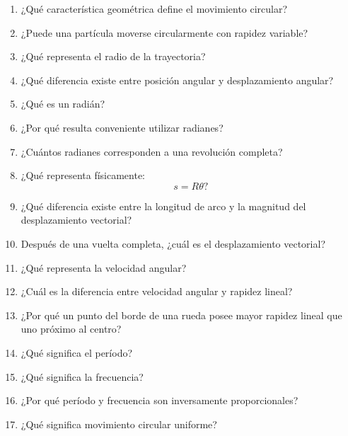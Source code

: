 \begin{enumerate}

    \item ¿Qué característica geométrica define el movimiento circular?

    \item ¿Puede una partícula moverse circularmente con rapidez variable?

    \item ¿Qué representa el radio de la trayectoria?

    \item ¿Qué diferencia existe entre posición angular y desplazamiento
    angular?

    \item ¿Qué es un radián?

    \item ¿Por qué resulta conveniente utilizar radianes?

    \item ¿Cuántos radianes corresponden a una revolución completa?

    \item ¿Qué representa físicamente:
    \[
    s=R\theta?
    \]

    \item ¿Qué diferencia existe entre la longitud de arco y la magnitud del
    desplazamiento vectorial?

    \item Después de una vuelta completa, ¿cuál es el desplazamiento vectorial?

    \item ¿Qué representa la velocidad angular?

    \item ¿Cuál es la diferencia entre velocidad angular y rapidez lineal?

    \item ¿Por qué un punto del borde de una rueda posee mayor rapidez lineal
    que uno próximo al centro?

    \item ¿Qué significa el período?

    \item ¿Qué significa la frecuencia?

    \item ¿Por qué período y frecuencia son inversamente proporcionales?

    \item ¿Qué significa movimiento circular uniforme?


\end{enumerate}
